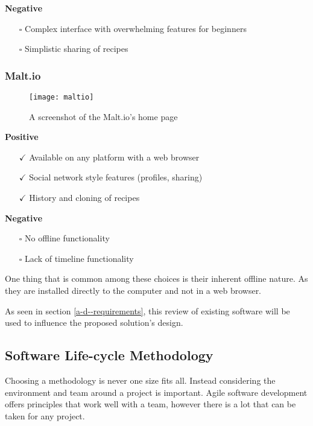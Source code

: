 \noindent\textbf{Negative}

\begin{itemize}
  \item[$\square$] Complex interface with overwhelming features for beginners
  \item[$\square$] Simplistic sharing of recipes
\end{itemize}

\subsubsection{Malt.io}

\begin{figure}[H]
  \centering
    \texttt{[image: maltio]}
  \caption{A screenshot of the Malt.io's home page}
  \label{figure-maltio}
\end{figure}

\noindent\textbf{Positive}

\begin{itemize}
  \item[$\checkmark$] Available on any platform with a web browser
  \item[$\checkmark$] Social network style features (profiles, sharing)
  \item[$\checkmark$] History and cloning of recipes
\end{itemize}

\noindent\textbf{Negative}

\begin{itemize}
  \item[$\square$] No offline functionality
  \item[$\square$] Lack of timeline functionality
\end{itemize}

One thing that is common among these choices is their inherent offline nature. As they are installed directly to the computer and not in a web browser.

As seen in section \ref{a-d--requirements}, this review of existing software will be used to influence the proposed solution's design.

\subsection{Software Life-cycle Methodology} \label{a-d--methodology--life-cycle}

Choosing a methodology is never one size fits all. Instead considering the environment and team around a project is important. Agile software development offers principles that work well with a team, however there is a lot that can be taken for any project.

